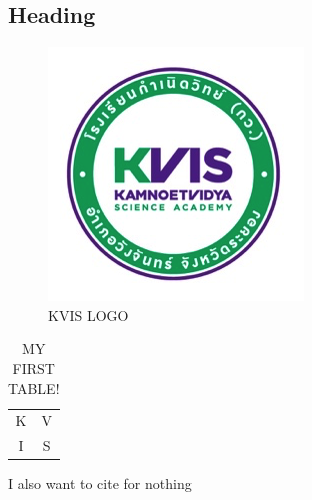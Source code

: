 
\subsection{Heading}
\begin{figure}[h]
    \includegraphics{static/logo.png}
    \centering
    \caption{KVIS LOGO}%
\end{figure}

\begin{table}[h]
    \centering
    \begin{tabular}{c|c}
         K & V \\
         I & S 
    \end{tabular}
    \caption{MY FIRST TABLE!}
\end{table}

I also want to cite \cite{Nobody06} for nothing
